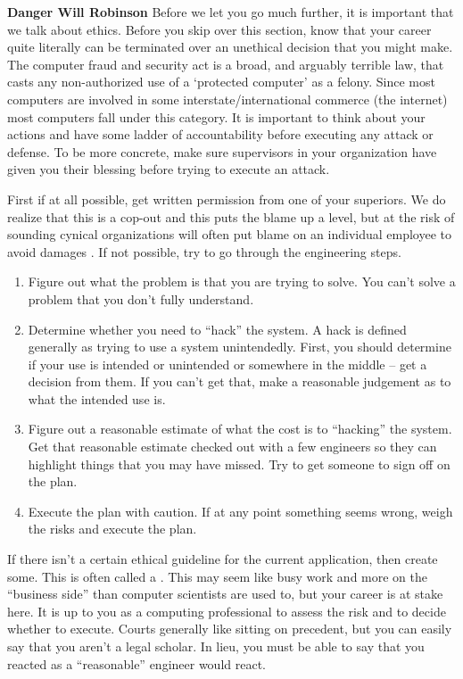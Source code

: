 \textbf{Danger Will Robinson} Before we let you go much further, it is important that we talk about ethics.
Before you skip over this section, know that your career quite literally can be terminated over an unethical decision that you might make.
The computer fraud and security act is a broad, and arguably terrible law, that casts any non-authorized use of a `protected computer' as a felony.
Since most computers are involved in some interstate/international commerce (the internet) most computers fall under this category.
It is important to think about your actions and have some ladder of accountability before executing any attack or defense.
To be more concrete, make sure supervisors in your organization have given you their blessing before trying to execute an attack.

First if at all possible, get written permission from one of your superiors.
We do realize that this is a cop-out and this puts the blame up a level, but at the risk of sounding cynical organizations will often put blame on an individual employee to avoid damages .
If not possible, try to go through the engineering steps.

\begin{enumerate}
\item Figure out what the problem is that you are trying to solve.
  You can't solve a problem that you don't fully understand.
\item Determine whether you need to ``hack'' the system.
  A hack is defined generally as trying to use a system unintendedly.
  First, you should determine if your use is intended or unintended or somewhere in the middle -- get a decision from them.
  If you can't get that, make a reasonable judgement as to what the intended use is.
\item Figure out a reasonable estimate of what the cost is to ``hacking'' the system.
  Get that reasonable estimate checked out with a few engineers so they can highlight things that you may have missed.
  Try to get someone to sign off on the plan.
\item Execute the plan with caution.
  If at any point something seems wrong, weigh the risks and execute the plan.
\end{enumerate}

If there isn't a certain ethical guideline for the current application, then create some.
This is often called a .
This may seem like busy work and more on the ``business side'' than computer scientists are used to, but your career is at stake here.
It is up to you as a computing professional to assess the risk and to decide whether to execute.
Courts generally like sitting on precedent, but you can easily say that you aren't a legal scholar.
In lieu, you must be able to say that you reacted as a ``reasonable'' engineer would react.

